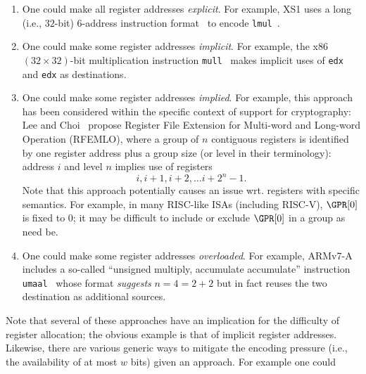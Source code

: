 \begin{itemize}
      \begin{enumerate}
      \item One could make all  register addresses {\em explicit}.
            For example, XS1 uses a long (i.e., $32$-bit) $6$-address 
            instruction format~\cite[Page 246]{SCARV:XS1:09} 
            to encode
            {\tt lmul}~\cite[Page 146]{SCARV:XS1:09}.
      \item One could make some register addresses {\em implicit}.  
            For example, the x86 $( 32 \times 32 )$-bit multiplication 
            instruction 
            {\tt mull}~\cite[Page 4-144]{SCARV:X86:2a:12} 
            makes implicit uses of {\tt edx} and {\tt edx} as destinations.
      \item One could make some register addresses {\em implied}.
            For example, this approach has been considered within the
            specific context of support for cryptography: 
            Lee and Choi~\cite{SCARV:LeeCho:08} propose Register File
            Extension for Multi-word and Long-word Operation (RFEMLO), 
            where a group of $n$ contiguous registers is identified by 
            one register address plus a group size (or level in their terminology): 
            address $i$ and level $n$ implies use of registers
            \[
            i, i + 1, i + 2, \ldots i + 2^n - 1 .
            \]
            Note that this approach potentially causes an issue wrt.
            registers with specific semantics.  For example, in many
            RISC-like ISAs (including RISC-V), $\GPR[0]$ is fixed to 
            $0$; it may be difficult to include or exclude $\GPR[0]$ 
            in a group as need be.
      \item One could make some register addresses {\em overloaded}.
            For example, ARMv7-A includes a so-called ``unsigned multiply,
            accumulate accumulate'' instruction 
            {\tt umaal}~\cite[Section A8.8.255]{SCARV:ARMv7_M:17} 
            whose format {\em suggests} $n = 4 = 2 + 2$ but in fact 
            reuses the two destination as additional sources.
      \end{enumerate}
      
      \noindent
      Note that several of these approaches have an implication for the
      difficulty of register allocation; the obvious example is that of
      implicit register addresses.  Likewise, there are various generic
      ways to mitigate the encoding pressure (i.e., the availability of 
      at most $w$ bits) given an approach.  For example one could
      

\end{itemize}
